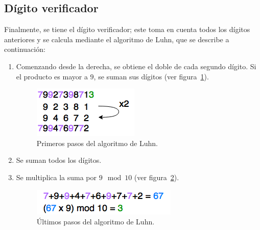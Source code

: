 \subsection{Dígito verificador}
Finalmente, se tiene el dígito verificador; este toma en cuenta todos los
dígitos anteriores y se calcula mediante el algoritmo de Luhn, que se describe
a continuación:
\begin{enumerate}
    \item Comenzando desde la derecha, se obtiene el doble de cada segundo
      dígito. Si el producto es mayor a $9$, se suman sus dígitos (ver
      figura~\ref{fig:luhn1}).
      \begin{figure}[H]
        \begin{center}
          \includegraphics[width=0.3\linewidth]{diagramas/luhn_1.png}
        \end{center}
        \caption{Primeros pasos del algoritmo de Luhn.}\label{fig:luhn1}
      \end{figure}
    \item Se suman todos los dígitos.
    \item Se multiplica la suma por $9 \mod  10$ (ver figura~\ref{fig:luhn2}).
      \begin{figure}[H]
        \begin{center}
          \includegraphics[width=0.5\linewidth]{diagramas/luhn_2.png}
        \end{center}
        \caption{Últimos pasos del algoritmo de Luhn.}\label{fig:luhn2}
      \end{figure}
\end{enumerate}
